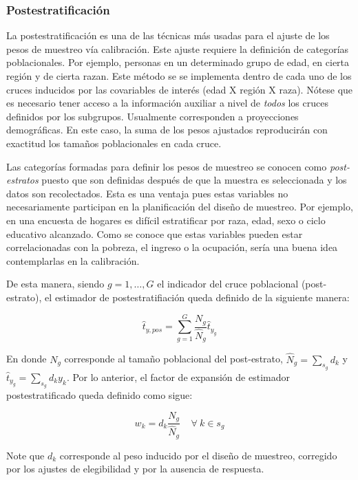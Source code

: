 \documentclass[
  10pt,
  spanish,
]{book}
\begin{document}
\hypertarget{postestratificaciuxf3n}{%
\subsubsection*{Postestratificación}\label{postestratificaciuxf3n}}

La postestratificación es una de las técnicas más usadas para el ajuste de los pesos de muestreo vía calibración. Este ajuste requiere la definición de categorías poblacionales. Por ejemplo, personas en un determinado grupo de edad, en cierta región y de cierta razan. Este método se se implementa dentro de cada uno de los cruces inducidos por las covariables de interés (edad X región X raza). Nótese que es necesario tener acceso a la información auxiliar a nivel de \emph{todos} los cruces definidos por los subgrupos. Usualmente corresponden a proyecciones demográficas. En este caso, la suma de los pesos ajustados reproducirán con exactitud los tamaños poblacionales en cada cruce.

Las categorías formadas para definir los pesos de muestreo se conocen como \emph{post-estratos} puesto que son definidas después de que la muestra es seleccionada y los datos son recolectados. Esta es una ventaja pues estas variables no necesariamente participan en la planificación del diseño de muestreo. Por ejemplo, en una encuesta de hogares es difícil estratificar por raza, edad, sexo o ciclo educativo alcanzado. Como se conoce que estas variables pueden estar correlacionadas con la pobreza, el ingreso o la ocupación, sería una buena idea contemplarlas en la calibración.

De esta manera, siendo \(g = 1, \ldots, G\) el indicador del cruce poblacional (post-estrato), el estimador de postestratifiación queda definido de la siguiente manera:

\[
\hat{t}_{y, pos} = \sum_{g = 1}^G \frac{N_g}{\hat{N}_g}\hat{t}_{y_g}
\]

En donde \(N_g\) corresponde al tamaño poblacional del post-estrato, \(\hat{N}_g = \sum_{s_g} d_{k}\) y \(\hat{t}_{y_g} = \sum_{s_g} d_{k} y_k\). Por lo anterior, el factor de expansión de estimador postestratificado queda definido como sigue:

\[
w_k= d_k \frac{N_g}{\hat{N}_g} \ \ \ \ \ \forall \ k \in s_g
\]

Note que \(d_k\) corresponde al peso inducido por el diseño de muestreo, corregido por los ajustes de elegibilidad y por la ausencia de respuesta.
\end{document}

